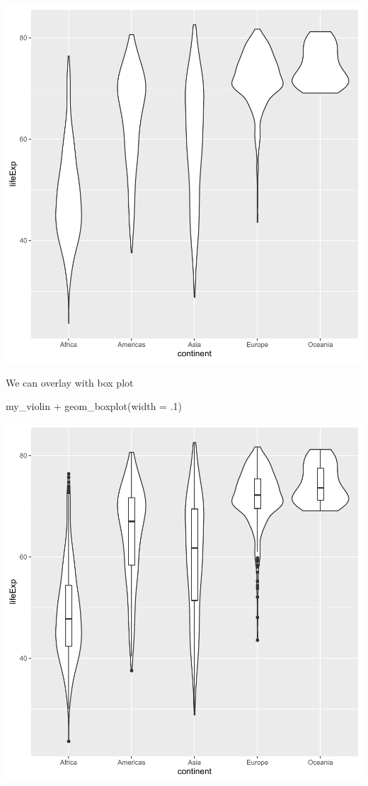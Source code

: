 \documentclass[
]{book}
\makeatletter
\newenvironment{Shaded}{\begin{snugshade}}{\end{snugshade}}
\newcommand{\AttributeTok}[1]{\textcolor[rgb]{0.61,0.61,0.61}{#1}}
\newcommand{\DecValTok}[1]{\textcolor[rgb]{0.06,0.06,0.06}{#1}}
\newcommand{\FunctionTok}[1]{\textcolor[rgb]{0,0,0}{#1}}
\newcommand{\NormalTok}[1]{#1}
\newcommand{\SpecialCharTok}[1]{\textcolor[rgb]{0,0,0}{#1}}
\newenvironment{kframe}{%
\medskip{}
\setlength{\fboxsep}{.8em}
 \def\at@end@of@kframe{}%
 \ifinner\ifhmode%
  \def\at@end@of@kframe{\end{minipage}}%
  \begin{minipage}{\columnwidth}%
 \fi\fi%
 \def\FrameCommand##1{\hskip\@totalleftmargin \hskip-\fboxsep
 \colorbox{shadecolor}{##1}\hskip-\fboxsep
     \hskip-\linewidth \hskip-\@totalleftmargin \hskip\columnwidth}%
 \MakeFramed {\advance\hsize-\width
   \@totalleftmargin\z@ \linewidth\hsize
   \@setminipage}}%
 {\par\unskip\endMakeFramed%
 \at@end@of@kframe}
\renewenvironment{Shaded}{\begin{kframe}}{\end{kframe}}
\makeatother
\begin{document}
\begin{center}\includegraphics[width=0.7\linewidth,keepaspectratio]{Multivariable_Data_Analysis_files/figure-latex/unnamed-chunk-86-1} \end{center}

We can overlay with box plot

\begin{Shaded}
\begin{Highlighting}[]
\NormalTok{my\_violin }\SpecialCharTok{+} \FunctionTok{geom\_boxplot}\NormalTok{(}\AttributeTok{width =}\NormalTok{ .}\DecValTok{1}\NormalTok{)}
\end{Highlighting}
\end{Shaded}

\begin{center}\includegraphics[width=0.7\linewidth,keepaspectratio]{Multivariable_Data_Analysis_files/figure-latex/unnamed-chunk-87-1} \end{center}
\end{document}
